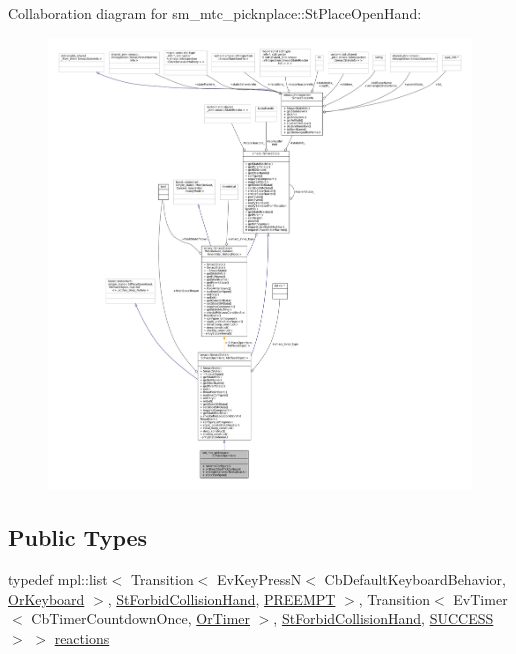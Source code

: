 Collaboration diagram for sm\+\_\+mtc\+\_\+picknplace\+:\+:St\+Place\+Open\+Hand\+:
\nopagebreak
\begin{figure}[H]
\begin{center}
\leavevmode
\includegraphics[width=350pt]{structsm__mtc__picknplace_1_1StPlaceOpenHand__coll__graph}
\end{center}
\end{figure}
\subsection*{Public Types}
\begin{DoxyCompactItemize}
\item 
typedef mpl\+::list$<$ Transition$<$ Ev\+Key\+PressN$<$ Cb\+Default\+Keyboard\+Behavior, \hyperlink{classsm__mtc__picknplace_1_1OrKeyboard}{Or\+Keyboard} $>$, \hyperlink{structsm__mtc__picknplace_1_1StForbidCollisionHand}{St\+Forbid\+Collision\+Hand}, \hyperlink{classPREEMPT}{P\+R\+E\+E\+M\+PT} $>$, Transition$<$ Ev\+Timer$<$ Cb\+Timer\+Countdown\+Once, \hyperlink{classsm__mtc__picknplace_1_1OrTimer}{Or\+Timer} $>$, \hyperlink{structsm__mtc__picknplace_1_1StForbidCollisionHand}{St\+Forbid\+Collision\+Hand}, \hyperlink{classSUCCESS}{S\+U\+C\+C\+E\+SS} $>$ $>$ \hyperlink{structsm__mtc__picknplace_1_1StPlaceOpenHand_aae904256bb142f18994f4c28dce0083f}{reactions}
\end{DoxyCompactItemize}
